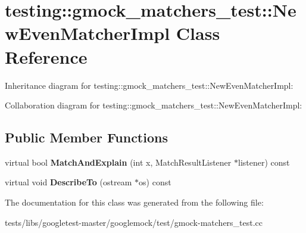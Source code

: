 \hypertarget{classtesting_1_1gmock__matchers__test_1_1NewEvenMatcherImpl}{}\section{testing\+:\+:gmock\+\_\+matchers\+\_\+test\+:\+:New\+Even\+Matcher\+Impl Class Reference}
\label{classtesting_1_1gmock__matchers__test_1_1NewEvenMatcherImpl}


Inheritance diagram for testing\+:\+:gmock\+\_\+matchers\+\_\+test\+:\+:New\+Even\+Matcher\+Impl\+:


Collaboration diagram for testing\+:\+:gmock\+\_\+matchers\+\_\+test\+:\+:New\+Even\+Matcher\+Impl\+:
\subsection*{Public Member Functions}
\begin{DoxyCompactItemize}
\item 
\mbox{\label{classtesting_1_1gmock__matchers__test_1_1NewEvenMatcherImpl_a56819af55d88569fdfaa51b937f76337}} 
virtual bool {\bfseries Match\+And\+Explain} (int x, Match\+Result\+Listener $\ast$listener) const
\item 
\mbox{\label{classtesting_1_1gmock__matchers__test_1_1NewEvenMatcherImpl_aece368c865501da4b30620d06a2690cd}} 
virtual void {\bfseries Describe\+To} (ostream $\ast$os) const
\end{DoxyCompactItemize}


The documentation for this class was generated from the following file\+:\begin{DoxyCompactItemize}
\item 
tests/libs/googletest-\/master/googlemock/test/gmock-\/matchers\+\_\+test.\+cc\end{DoxyCompactItemize}
